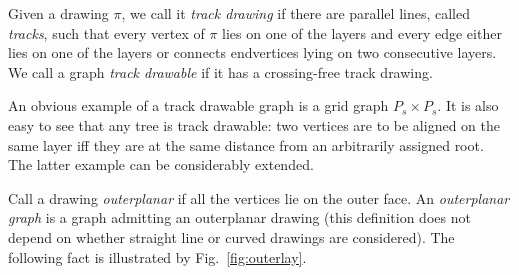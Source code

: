 \documentclass[reqno,12pt]{amsart}
\begin{document}
Given a drawing $\pi$, we call it \emph{track drawing} if there are parallel
lines, called \emph{tracks}, such that every vertex of $\pi$ lies on
one of the layers and every edge either lies on one of the layers or
connects endvertices lying on two consecutive layers. We call a graph
\emph{track drawable}
if it has a crossing-free track drawing. 

An obvious example of a track drawable graph is a grid graph $P_s\times P_s$.
It is also easy to see that any tree is track drawable:
two vertices are to be aligned on the same layer iff they are at the same
distance from an arbitrarily assigned root. The latter example can be considerably
extended. 

Call a drawing \emph{outerplanar} if all the vertices lie on
the outer face. An \emph{outerplanar graph} is a graph admitting
an outerplanar drawing (this definition
does not depend on whether straight line or curved drawings are considered).
The following fact is illustrated by Fig.~\ref{fig:outerlay}.
\end{document}
